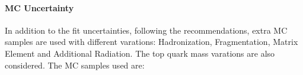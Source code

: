 


\paragraph{\ttbar MC Uncertainty}
\label{sec:b-tagging-unc}
\hspace{0.1mm}\newline

In addition to the \ttbar fit uncertainties, following the recommendations, extra \ttbar MC samples are used with different varations: Hadronization, Fragmentation, Matrix Element and Additional Radiation. The top quark mass varations are also considered. The MC samples used are:

